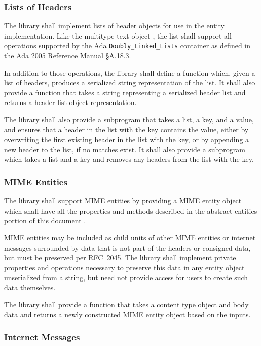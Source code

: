 \documentclass[11pt]{article}
\begin{document}
\subsubsection{Lists of Headers}
\label{pi:header-lists}

The library shall implement lists of header objects for use in the
entity implementation. Like the multitype text object
, the list shall support all operations
supported by the Ada \texttt{Doubly\_Linked\_Lists} container as
defined in the Ada 2005 Reference Manual \S{}A.18.3.

In addition to those operations, the library shall define a function
which, given a list of headers, produces a serialized string
representation of the list. It shall also provide a function that
takes a string representing a serialized header list and returns a
header list object representation.

The library shall also provide a subprogram that takes a list, a key,
and a value, and ensures that a header in the list with the key
contains the value, either by overwriting the first existing header in
the list with the key, or by appending a new header to the list, if no
matches exist. It shall also provide a subprogram which takes a list
and a key and removes any headers from the list with the key. 

\subsubsection{MIME Entities}
\label{pi:mime-entities}

The library shall support MIME entities by providing a MIME entity
object which shall have all the properties and methods described in
the abstract entities portion of this document
.

MIME entities may be included as child units of other MIME entities or
internet messages surrounded by data that is not part of the headers
or consigned data, but must be preserved per RFC~2045. The library
shall implement private properties and operations necessary to
preserve this data in any entity object unserialized from a string,
but need not provide access for users to create such data themselves.

The library shall provide a function that takes a content type object
 and body data and returns a newly constructed
MIME entity object based on the inputs.

\subsubsection{Internet Messages}
\label{pi:messages}
\end{document}
